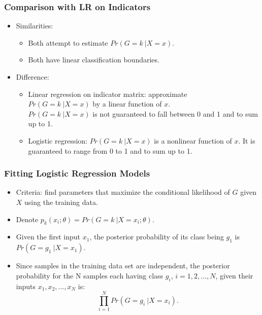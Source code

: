 \documentclass[12pt,notes,mathserif]{beamer}
\begin{document}
\begin{frame}[c]
	\frametitle{Comparison with LR on Indicators}
	\begin{itemize}
		\item  Similarities:
		      \begin{itemize}
			      \item  Both attempt to estimate $Pr(G=k~|X=x)$.
			      \item
			            Both have linear classification boundaries.
		      \end{itemize}

		\item  Difference:
		      \begin{itemize}
			      \item  Linear regression on indicator matrix: approximate\\
			            $Pr(G=k~|X=x)$ by a linear function of $x$.\\
			            $Pr(G=k~|X=x)$ is not guaranteed to fall between 0 and 1 and to sum up to 1.
			      \item  Logistic regression: $Pr(G=k~|X=x)$ is a nonlinear function of $x$. It is guaranteed to range from 0 to 1 and to sum up to 1.
		      \end{itemize}
	\end{itemize}
\end{frame}



\begin{frame}[c]
	\frametitle{Fitting Logistic Regression Models}
	\begin{itemize}
		\item Criteria: find parameters that maximize the conditional likelihood of $G$ given $X$ using the training data.
		\item Denote $p_k (x_i;\theta) = Pr(G = k~| X = x_i;\theta)$.
		\item Given the first input $x_1$, the posterior probability of its class being $g_1$ is $Pr(G = g_1~| X = x_1)$.
		\item  Since samples in the training data set are independent, the posterior probability for the N samples each having class $g_i$, $i = 1,2,\ldots,N$, given their inputs $x_1, x_2, ..., x_N$ is:
		      \begin{equation*}
			      \prod\limits_{i=1}^N Pr(G=g_i~|X=x_i).
		      \end{equation*}
	\end{itemize}
\end{frame}
\end{document}

